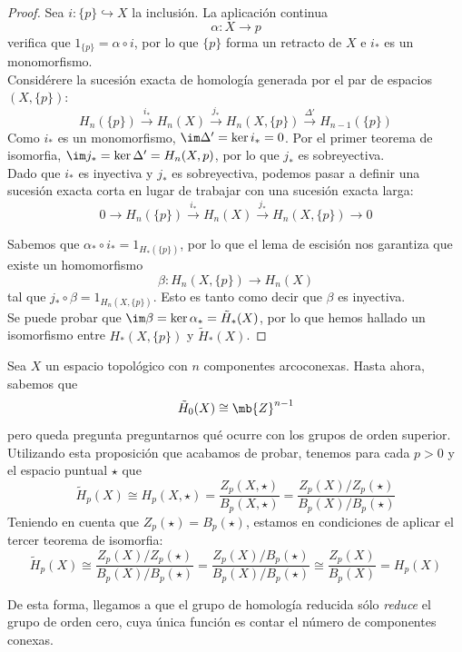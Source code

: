 \begin{proof}
Sea $i: \{p\} \hookrightarrow X$ la inclusión. La aplicación continua $$\alpha: X \longrightarrow {p}$$ verifica que $1_{\{p\}}=\alpha\circ i$, por lo que $\{p\}$ forma un retracto de $X$ e $i_*$ es un monomorfismo.
\\

Considérere la sucesión exacta de homología generada por el par de espacios $(X,\{p\})$: $$H_n(\{p\}) \xrightarrow{i_*} H_n(X) \xrightarrow{j_*} H_n(X,\{p\}) \xrightarrow{\Delta'} H_{n-1}(\{p\})$$ Como $i_*$ es un monomorfismo, $\im \Delta'=\ker i_*=0$. Por el primer teorema de isomorfia, $\im j_*=\ker \Delta'=H_n(X,p)$, por lo que $j_*$ es sobreyectiva.
\\

Dado que $i_*$ es inyectiva y $j_*$ es sobreyectiva, podemos pasar a definir una sucesión exacta corta en lugar de trabajar con una sucesión exacta larga: $$0 \longrightarrow H_n(\{p\}) \xrightarrow{i_*} H_n(X) \xrightarrow{j_*} H_n(X,\{p\}) \longrightarrow 0$$

Sabemos que $\alpha_* \circ i_*=1_{H_*(\{p\})}$, por lo que el lema de escisión nos garantiza que existe un homomorfismo $$\beta: H_n(X,\{p\}) \longrightarrow H_n(X)$$ tal que $j_*\circ \beta=1_{H_n(X,\{p\})}$. Esto es tanto como decir que $\beta$ es inyectiva.
\\

Se puede probar que $\im \beta=\ker \alpha_*=\tilde{H}_*(X)$, por lo que hemos hallado un isomorfismo entre $H_*(X,\{p\})$ y $\tilde{H}_*(X)$.
\end{proof}

Sea $X$ un espacio topológico con $n$ componentes arcoconexas. Hasta ahora, sabemos que $$\tilde{H}_0(X) \cong \mb{Z}^{n-1}$$ pero queda pregunta preguntarnos qué ocurre con los grupos de orden superior. Utilizando esta proposición que acabamos de probar, tenemos para cada $p > 0$ y el espacio puntual $\star$ que \[\tilde{H}_p(X)\cong H_p(X,\star)=\frac{Z_p(X,\star)}{B_p(X,\star)}=\frac{Z_p(X)/Z_p(\star)}{B_p(X)/B_p(\star)}\] Teniendo en cuenta que $Z_p(\star)=B_p(\star)$, estamos en condiciones de aplicar el tercer teorema de isomorfia: \[\tilde{H}_p(X)\cong \frac{Z_p(X)/Z_p(\star)}{B_p(X)/B_p(\star)}=\frac{Z_p(X)/B_p(\star)}{B_p(X)/B_p(\star)} \cong \frac{Z_p(X)}{B_p(X)}=H_p(X)\]

De esta forma, llegamos a que el grupo de homología reducida sólo \textit{reduce} el grupo de orden cero, cuya única función es contar el número de componentes conexas.

